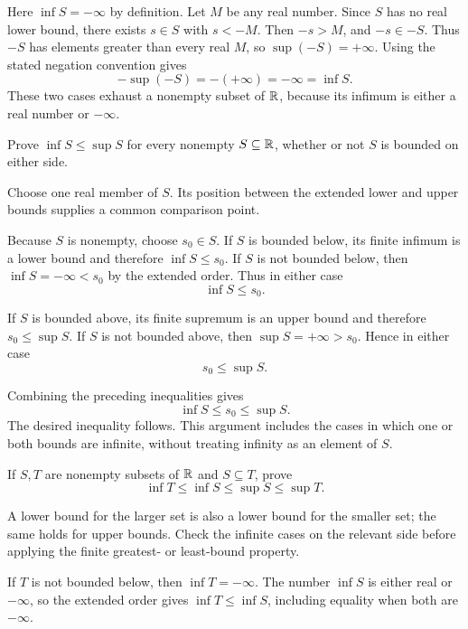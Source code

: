 Here $\inf S=-\infty$ by definition. Let $M$ be any real number.
Since $S$ has no real lower bound, there exists $s\in S$ with
$s<-M$. Then $-s>M$, and $-s\in-S$. Thus $-S$ has elements
greater than every real $M$, so $\sup(-S)=+\infty$.
Using the stated negation convention gives
\[
 -\sup(-S)=-(+\infty)=-\infty=\inf S.
\]
These two cases exhaust a nonempty subset of $\mathbb{R}$, because its
infimum is either a real number or $-\infty$.


\goal Prove $\inf S\le\sup S$ for every nonempty $S\subseteq\mathbb{R}$,
whether or not $S$ is bounded on either side.

\idea Choose one real member of $S$. Its position between the
extended lower and upper bounds supplies a common comparison point.

Because $S$ is nonempty, choose $s_0\in S$. If $S$ is bounded below,
its finite infimum is a lower bound and therefore $\inf S\le s_0$.
If $S$ is not bounded below, then $\inf S=-\infty<s_0$ by the
extended order. Thus in either case
\[
 \inf S\le s_0.
\]

If $S$ is bounded above, its finite supremum is an upper bound and
therefore $s_0\le\sup S$. If $S$ is not bounded above, then
$\sup S=+\infty>s_0$. Hence in either case
\[
 s_0\le\sup S.
\]

Combining the preceding inequalities gives
\[
 \inf S\le s_0\le\sup S.
\]
The desired inequality follows. This argument includes the cases in
which one or both bounds are infinite, without treating infinity as
an element of $S$.


\goal If $S,T$ are nonempty subsets of $\mathbb{R}$ and $S\subseteq T$,
prove
\[
 \inf T\le\inf S\le\sup S\le\sup T.
\]

\idea A lower bound for the larger set is also a lower bound for the
smaller set; the same holds for upper bounds. Check the infinite cases
on the relevant side before applying the finite greatest- or
least-bound property.

If $T$ is not bounded below, then $\inf T=-\infty$.
The number $\inf S$ is either real or $-\infty$, so the extended
order gives $\inf T\le\inf S$, including equality when both are
$-\infty$.

